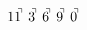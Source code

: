 \documentclass[preview]{standalone}
\begin{document}
\begin{align*}
11^{\hspace{-0.1cm}\urcorner} \ 3^{\hspace{-0.1cm}\urcorner} \ 6^{\hspace{-0.1cm}\urcorner} \ 9^{\hspace{-0.1cm}\urcorner} \ 0^{\hspace{-0.1cm}\urcorner}
\end{align*}
\end{document}
